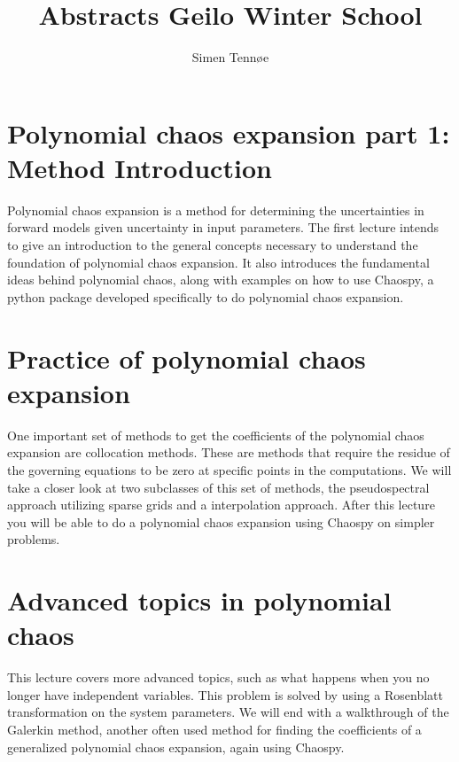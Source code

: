 \documentclass[a4paper,10pt]{article}
\title{Abstracts Geilo Winter School}
\author{Simen Tennøe}
\begin{document}
\maketitle
\newpage


\section{Polynomial chaos expansion part 1: Method Introduction}
Polynomial chaos expansion is a method for determining the
uncertainties in forward models given uncertainty in input parameters.
The first lecture intends to give an introduction to the general concepts necessary to understand the foundation of polynomial chaos expansion. It also introduces the fundamental ideas behind polynomial chaos, along with examples on how to use Chaospy, a python package developed specifically to do polynomial chaos expansion.




\section{Practice of polynomial chaos expansion}
One important set of methods to get the coefficients of the polynomial chaos expansion are collocation methods. These are methods that require the residue of the governing equations to be zero at specific points in the computations. We will take a closer look at two subclasses of this set of methods, the pseudospectral approach utilizing sparse grids and a interpolation approach.
After this lecture you will be able to do a polynomial chaos expansion using Chaospy on simpler problems.




\section{Advanced topics in polynomial chaos}
This lecture covers more advanced topics, such as what happens when you no longer have independent variables. This problem is solved by using a Rosenblatt transformation on the system parameters. %
We will end with a walkthrough of the Galerkin method, another often used method for finding the coefficients of a generalized polynomial chaos expansion, again using Chaospy.
\end{document}
